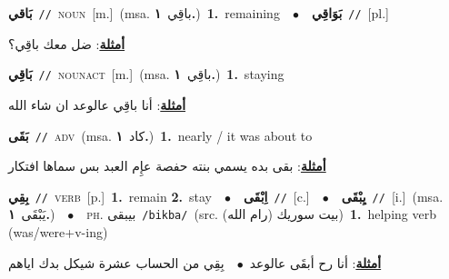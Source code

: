 \documentclass[10pt,a4paper,twoside]{article} %
\begin{document}
\begin{multicols}{2}
{\setlength\topsep{0pt}\textbf{\foreignlanguage{arabic}{بَاقي}}\ {\color{gray}\texttt{//}\color{black}}\ \textsc{noun}\ [m.]\ \color{gray}(msa. \foreignlanguage{arabic}{باقِي}~\foreignlanguage{arabic}{\textbf{١.}})\color{black}\ \textbf{1.}~remaining\ \ $\bullet$\ \ \setlength\topsep{0pt}\textbf{\foreignlanguage{arabic}{بَوَاقِي}}\ {\color{gray}\texttt{//}\color{black}}\ [pl.]\  \begin{flushright}\color{gray}\foreignlanguage{arabic}{\textbf{\underline{\foreignlanguage{arabic}{أمثلة}}}: ضل معك باقِي؟}\end{flushright}\color{black}} \vspace{2mm}

{\setlength\topsep{0pt}\textbf{\foreignlanguage{arabic}{بَاقِي}}\ {\color{gray}\texttt{//}\color{black}}\ \textsc{noun\textunderscore act}\ [m.]\ \color{gray}(msa. \foreignlanguage{arabic}{باقِي}~\foreignlanguage{arabic}{\textbf{١.}})\color{black}\ \textbf{1.}~staying\  \begin{flushright}\color{gray}\foreignlanguage{arabic}{\textbf{\underline{\foreignlanguage{arabic}{أمثلة}}}: أنا باقِي عالوعد ان شاء الله}\end{flushright}\color{black}} \vspace{2mm}

{\setlength\topsep{0pt}\textbf{\foreignlanguage{arabic}{بَقَى}}\ {\color{gray}\texttt{//}\color{black}}\ \textsc{adv}\ \color{gray}(msa. \foreignlanguage{arabic}{كاد}~\foreignlanguage{arabic}{\textbf{١.}})\color{black}\ \textbf{1.}~nearly / it was about to\  \begin{flushright}\color{gray}\foreignlanguage{arabic}{\textbf{\underline{\foreignlanguage{arabic}{أمثلة}}}: بقى بده يسمي بنته حفصة عإِم العبد بس سماها افتكار}\end{flushright}\color{black}} \vspace{2mm}

{\setlength\topsep{0pt}\textbf{\foreignlanguage{arabic}{بِقِي}}\ {\color{gray}\texttt{//}\color{black}}\ \textsc{verb}\ [p.]\ \textbf{1.}~remain  \textbf{2.}~stay\ \ $\bullet$\ \ \setlength\topsep{0pt}\textbf{\foreignlanguage{arabic}{اِبْقَى}}\ {\color{gray}\texttt{//}\color{black}}\ [c.]\ \ $\bullet$\ \ \setlength\topsep{0pt}\textbf{\foreignlanguage{arabic}{يِبْقَى}}\ {\color{gray}\texttt{//}\color{black}}\ [i.]\ \color{gray}(msa. \foreignlanguage{arabic}{يَبْقَى}~\foreignlanguage{arabic}{\textbf{١.}})\color{black}\ \ $\bullet$\ \ \textsc{ph.} \color{gray} \foreignlanguage{arabic}{بيبقى}\color{black}\ {\color{gray}\texttt{/{\sffamily bikba}/}\color{black}}\ \color{gray}(src. \foreignlanguage{arabic}{بيت سوريك (رام الله)})\color{black}\ \textbf{1.}~helping verb (was/were+v-ing)\  \begin{flushright}\color{gray}\foreignlanguage{arabic}{\textbf{\underline{\foreignlanguage{arabic}{أمثلة}}}: أنا رح أبقَى عالوعد\ $\bullet$\ \  بِقِي من الحساب عشرة شيكل بدك اياهم}\end{flushright}\color{black}} \vspace{2mm}


\end{multicols}
\end{document}
